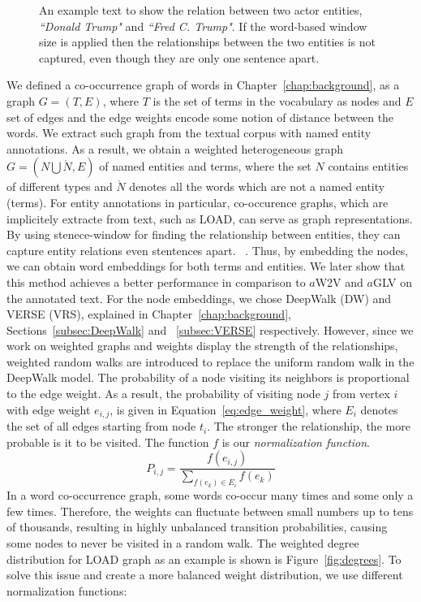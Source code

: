\begin{figure}
\centering 
\resizebox{0.90\textwidth}{0.2\textwidth}{      

}
\caption{An example text to show the relation between two actor entities, \emph{``Donald Trump"} and \emph{``Fred C. Trump"}. If the word-based window size is applied then the relationships between the two entities is not captured, even though they are only one sentence apart. }
\label{fig:article_entities}
\end{figure}
\noindent
We defined a co-occurrence graph of words in Chapter~\ref{chap:background}, as a graph $G=(T,E)$, where $T$ is the set of terms in the vocabulary as nodes and $E$ set of edges and the edge weights encode some notion of distance between the words. We extract such graph from the textual corpus with named entity annotations. As a result, we obtain a weighted heterogeneous graph $G=(N\bigcup  \acute {N},E)$ of named entities and terms, where the set $N$ contains entities of different types and $ \acute {N }$ denotes all the words which are not a named entity (terms). For entity annotations in particular, co-occurence graphs, which are implicitely extracte from text, such as LOAD, can serve as graph representations. By using stenece-window for finding the relationship between entities, they can capture entity relations even stentences apart. ~. Thus, by embedding the nodes, we can obtain word embeddings for both terms and entities.  We later show that this method achieves a better performance in comparison to $a$W2V and $a$GLV on the annotated text. For the node embeddings, we chose DeepWalk (DW) and VERSE (VRS), explained in Chapter~\ref{chap:background}, Sections~\ref{subsec:DeepWalk} and ~\ref{subsec:VERSE} respectively. However, since we work on weighted graphs and weights display the strength of the relationships, weighted random walks are introduced to replace the uniform random walk in the DeepWalk model. The probability of a node visiting its neighbors is proportional to the edge weight. As a result, the probability of visiting node $j$ from vertex $i$ with edge weight $e_{i,j}$,  is given in Equation~\ref{eq:edge_weight}, where $ E_{ i }$ denotes the set of all edges starting from node $t_{i}$. The stronger the relationship, the more probable is it to be visited. The function $f$ is our \emph{normalization function}. 
\begin{equation}
P_{i,j}=\frac{f(e_{i,j})}{\sum _{ f(e_ k )\in E_{ i } }^{  }{ f(e_k) } }
\label{eq:edge_weight}
\end{equation}
In a word co-occurrence
graph, some words co-occur many times and some only a few times. Therefore, the weights can fluctuate between small numbers up to tens of thousands, resulting in highly unbalanced transition probabilities, causing some nodes to never be visited in a random walk. The weighted degree distribution for LOAD graph as an example is shown is Figure~\ref{fig:degrees}. To solve this issue and create a more balanced weight distribution, we use different normalization functions:

